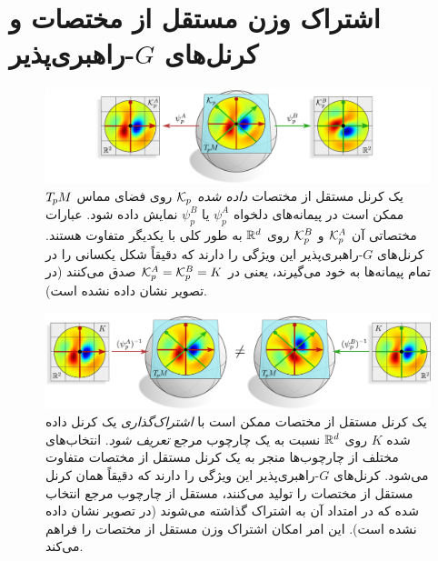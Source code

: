 

\section{اشتراک وزن مستقل از مختصات و کرنل‌های $G$-راهبری‌پذیر}
\label{apx:coord_indep_weight_sharing}


\begin{figure}
    \centering
    \includegraphics[width=1.\columnwidth]{figures/kernel_apx_coordinatization.pdf}
    \vspace*{-3.5ex}
    \caption{\small
        یک کرنل مستقل از مختصات \emph{داده شده} $\mathcal{K}_p$ روی فضای مماس $T_{\mkern-1.5mu p}\mkern-.5muM$ ممکن است در پیمانه‌های دلخواه $\psi_p^A$ یا $\psi_p^B$ نمایش داده شود.
        عبارات مختصاتی آن $\mathcal{K}_p^A$ و $\mathcal{K}_p^B$ روی $\mathbb{R}^d$ به طور کلی با یکدیگر متفاوت هستند.
        کرنل‌های $G$-راهبری‌پذیر این ویژگی را دارند که دقیقاً شکل یکسانی را در تمام پیمانه‌ها به خود می‌گیرند، یعنی در $\mathcal{K}_p^A = \mathcal{K}_p^B = K$ صدق می‌کنند (در تصویر نشان داده نشده است).
    }
    \label{fig:kernel_apx_coordinatization}
\end{figure}


\begin{figure}
    \centering
    \includegraphics[width=1.\columnwidth]{figures/kernel_apx_sharing.pdf}
    \vspace*{-3.5ex}
    \caption{\small
        یک کرنل مستقل از مختصات ممکن است با \emph{اشتراک‌گذاری} یک کرنل داده شده $K$ روی $\mathbb{R}^d$ نسبت به یک چارچوب مرجع \emph{تعریف شود}.
        انتخاب‌های مختلف از چارچوب‌ها منجر به یک کرنل مستقل از مختصات متفاوت می‌شود.
        کرنل‌های $G$-راهبری‌پذیر این ویژگی را دارند که دقیقاً همان کرنل مستقل از مختصات را تولید می‌کنند، مستقل از چارچوب مرجع انتخاب شده که در امتداد آن به اشتراک گذاشته می‌شوند (در تصویر نشان داده نشده است).
        این امر امکان اشتراک وزن مستقل از مختصات را فراهم می‌کند.
    }
    \label{fig:kernel_apx_sharing}
\end{figure}


